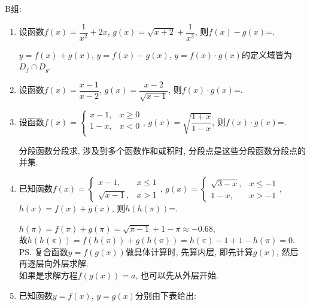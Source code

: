 B组:

\begin{enumerate}

\item 设函数$f(x)=\dfrac{1}{x^2}+2x$, $g(x)=\sqrt{x+2}+\dfrac{1}{x^2}$, 则$f(x)-g(x)$=. 
\begin{jieda}
$y=f(x)+g(x)$, $y=f(x)-g(x)$, $y=f(x)\cdot g(x)$的定义域皆为$D_f\cap D_g$. 
\end{jieda}

\item 设函数$f(x)=\dfrac{x-1}{x-2}$, $g(x)=\dfrac{x-2}{\sqrt{x-1}}$, 则$f(x)\cdot g(x)$=.


\item 设函数$f(x)=\begin{cases}
x-1, & x\geq 0\\
1-x, & x<0\\
\end{cases}$, 
$g(x)=\sqrt{\dfrac{1+x}{1-x}}$, 则$f(x)\cdot g(x)$=\blkda[4.2]{$\begin{cases}
\sqrt{1-x^2},  & x\in[-1,0)\\
-\sqrt{1-x^2}, & x\in[0,1)
\end{cases}$}. 
\begin{jieda}
分段函数分段求, 涉及到多个函数作和或积时, 分段点是这些分段函数分段点的并集. 
\end{jieda}


\item 已知函数$f(x)=\begin{cases}
x-1, & x\leq 1\\
\sqrt{x-1}, & x>1
\end{cases}$, 
$g(x)=\begin{cases}
\sqrt{3-x}, & x\leq -1\\
1-x, & x>-1
\end{cases}$, 
$h(x)=f(x)+g(x)$, 
则$h(h(\pi))$=. 
\begin{jieda}
$h(\pi)=f(\pi)+g(\pi)=\sqrt{\pi-1}+1-\pi\approx-0.68$, \\
故$h(h(\pi))=f(h(\pi))+g(h(\pi))=h(\pi)-1+1-h(\pi)=0$. \\
\ps 复合函数$y=f(g(x))$做具体计算时, 先算内层, 即先计算$g(x)$, 然后再逐层向外层求解. \\
如果是求解方程$f(g(x))=a$, 也可以先从外层开始. 
\end{jieda}

\item 已知函数$y=f(x)$, $y=g(x)$分别由下表给出: 


\end{enumerate}
